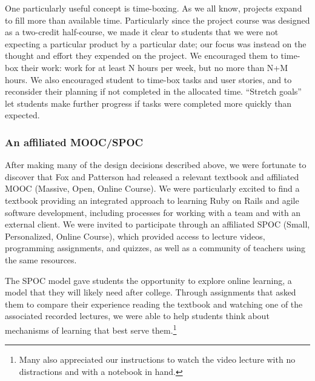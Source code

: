 One particularly useful concept is time-boxing.
As we all know, projects expand to fill more than available time.
Particularly since the project course was designed as a two-credit 
half-course, we made it clear to students that we were not expecting
a particular product by a particular date; our focus was instead on the
thought and effort they expended on the project.  We encouraged them
to time-box their work: work for at least N hours per week, but no more
than N+M hours.  We also encouraged student to time-box tasks 
and user stories, and to reconsider their planning if not completed in the 
allocated time.  ``Stretch goals'' let students make further progress 
if tasks were completed more quickly than expected.

\subsubsection{An affiliated MOOC/SPOC}

After making many of the design decisions described above, we were
fortunate to discover that Fox and Patterson had released a relevant
textbook \cite{saasbook} and affiliated MOOC (Massive, Open, Online
Course).  
We were particularly excited to find a textbook providing an integrated
approach to learning Ruby on Rails and agile software development, 
including processes for working with a team and with an external client.
We were invited to participate through an affiliated SPOC
(Small, Personalized, Online Course), which provided access to lecture 
videos, programming assignments, and quizzes, 
as well as a community of teachers using the same resources.

The SPOC model gave students the
opportunity to explore online learning, a model
that they will likely need after college.  Through
assignments that asked them to compare their experience reading the
textbook and watching one of the associated recorded lectures, we
were able to help students think about mechanisms of learning that
best serve them.\footnote{Many also appreciated our instructions
to watch the video lecture with no distractions and with a notebook
in hand.} 
